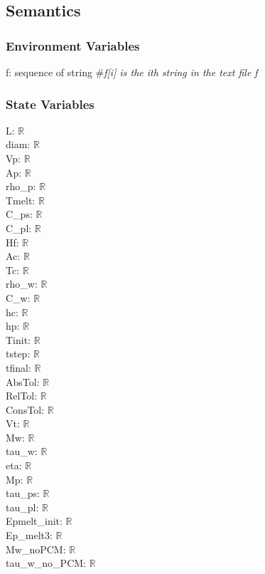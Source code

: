 \documentclass[12pt]{article}
\begin{document}
\subsection{Semantics}

\subsubsection{Environment Variables}

f: sequence of string \#\textit{f[i] is the ith string in the text file f}\\ 

\subsubsection{State Variables}

L: $\mathbb{R}$ \\
diam: $\mathbb{R}$ \\
Vp: $\mathbb{R}$ \\
Ap: $\mathbb{R}$ \\
rho\_p: $\mathbb{R}$ \\
Tmelt: $\mathbb{R}$ \\
C\_ps: $\mathbb{R}$ \\
C\_pl: $\mathbb{R}$ \\
Hf: $\mathbb{R}$ \\
Ac: $\mathbb{R}$ \\
Tc: $\mathbb{R}$ \\
rho\_w: $\mathbb{R}$ \\
C\_w: $\mathbb{R}$ \\
hc: $\mathbb{R}$ \\
hp: $\mathbb{R}$ \\
Tinit: $\mathbb{R}$ \\
tstep: $\mathbb{R}$ \\
tfinal: $\mathbb{R}$ \\
AbsTol: $\mathbb{R}$ \\
RelTol: $\mathbb{R}$ \\
ConsTol: $\mathbb{R}$ \\
Vt: $\mathbb{R}$ \\
Mw: $\mathbb{R}$ \\
tau\_w: $\mathbb{R}$ \\
eta: $\mathbb{R}$ \\
Mp: $\mathbb{R}$ \\
tau\_ps: $\mathbb{R}$ \\
tau\_pl: $\mathbb{R}$ \\
Epmelt\_init: $\mathbb{R}$ \\
Ep\_melt3: $\mathbb{R}$ \\ 
Mw\_noPCM: $\mathbb{R}$ \\
tau\_w\_no\_PCM: $\mathbb{R}$
\end{document}
